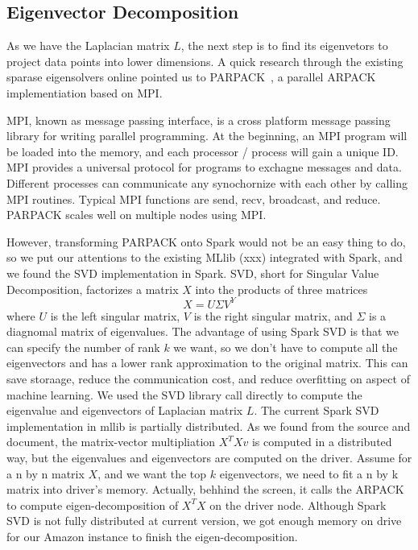 \documentclass{acm_proc_article-sp}
\begin{document}
\subsection{Eigenvector Decomposition}
As we have the Laplacian matrix $L$, the next step is to find its eigenvetors to project data points into lower dimensions. A quick research through the existing sparase eigensolvers online pointed us to PARPACK~\cite{ding2011parallel}, a parallel ARPACK implementiation based on MPI.

MPI, known as message passing interface, is a cross platform message passing library for writing parallel programming. At the beginning, an MPI program will be loaded into the memory, and each processor / process will gain a unique ID. MPI provides a universal protocol for programs to exchagne messages and data. Different processes can communicate any synochornize with each other by calling MPI routines. Typical MPI functions are send, recv, broadcast, and reduce. PARPACK scales well on multiple nodes using MPI.

However, transforming PARPACK onto Spark would not be an easy thing to do, so we put our attentions to the existing MLlib (xxx) integrated with Spark, and we found the SVD implementation in Spark. SVD, short for Singular Value Decomposition, factorizes a matrix $X$ into the products of three matrices $$X = U\Sigma V^Y$$ where $U$ is the left singular matrix, $V$ is the right singular matrix, and $\Sigma$ is a diagnomal matrix of eigenvalues. The advantage of using Spark SVD is that we can specify the number of rank $k$ we want, so we don't have to compute all the eigenvectors and has a lower rank approximation to the original matrix. This can save storaage, reduce the communication cost, and reduce overfitting on aspect of machine learning. We used the SVD library call directly to compute the eigenvalue and eigenvectors of Laplacian matrix $L$. The current Spark SVD implementation in mllib is partially distributed. As we found from the source and document, the matrix-vector multipliation $X^TXv$ is computed in a distributed way, but the eigenvalues and eigenvectors are computed on the driver. Assume for a n by n matrix $X$, and we want the top $k$ eigenvectors, we need to fit a n by k matrix into driver's memory. Actually, behhind the screen, it calls the ARPACK to compute eigen-decomposition of $X^TX$ on the driver node. Although Spark SVD is not fully distributed at current version, we got enough memory on drive for our Amazon instance to finish the eigen-decomposition.
\end{document}
